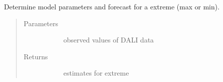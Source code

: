 \documentclass[letterpaper,10pt,english]{sphinxmanual}
\begin{document}
\begin{fulllineitems}
\label{\detokenize{autoapi/src/forecast/forecast/index:src.forecast.forecast.determine_estimates}}
Determine model parameters and forecast for a extreme (max or min).
\begin{quote}\begin{description}
\item[{Parameters}] \leavevmode\begin{description}
\item[{}] \leavevmode{[}\sphinxcode{\sphinxupquote{pd.DataFrame}}{]}
observed values of DALI data

\end{description}

\item[{Returns}] \leavevmode\begin{description}
\item[{}] \leavevmode
estimates for extreme

\end{description}

\end{description}\end{quote}

\end{fulllineitems}

\end{document}
